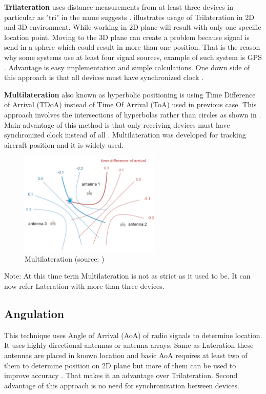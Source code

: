 \textbf{Trilateration} uses distance measurements from at least three devices in particular as "tri" in the name suggests \cite{RAinWILTaS}.  illustrates usage of Trilateration in 2D and 3D environment. While working in 2D plane will result with only one specific location point. Moving to the 3D plane can create a problem because signal is send in a sphere which could result in more than one position. That is the reason why some systems use at least four signal sources, example of such system is GPS \cite{GNSSGPS}. Advantage is easy implementation and simple calculations. One down side of this approach is that all devices must have synchronized clock \cite{RAinWILTaS}.

\medskip

\textbf{Multilateration} also known as hyperbolic positioning is using Time Difference of Arrival (TDoA) instead of Time Of Arrival (ToA) used in previous case. This approach involves the intersections of hyperbolas rather than circles as shown in . Main advantage of this method is that only receiving devices must have synchronized clock instead of all \cite{PLTaA}. Multilateration was developed for tracking aircraft position and it is widely used.

\begin{figure}[h!]
	\begin{centering}
		\includegraphics[width=0.6\textwidth]{img/multilateration}
		\par\end{centering}
	\caption{Multilateration (source: \cite{HPwAA})\label{fig:Multilateration}}
	\label{fig3}
\end{figure}

Note: At this time term Multilateration is not as strict as it used to be. It can now refer Lateration with more than three devices.

\subsection{Angulation}\label{sec:Angulation}
This technique uses Angle of Arrival (AoA) of radio signals to determine location. It uses highly directional antennas or antenna arrays. Same as Lateration these antennas are placed in known location and basic AoA requires at least two of them to determine position on 2D plane but more of them can be used to improve accuracy \cite{RAinWILTaS}. That makes it an advantage over Trilateration. Second advantage of this approach is no need for synchronization between devices.


